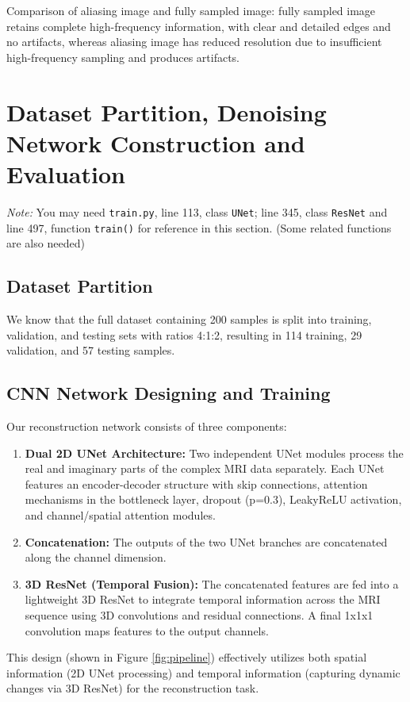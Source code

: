\documentclass{article}
\begin{document}
Comparison of aliasing image and fully sampled image: fully sampled image retains
complete high-frequency information, with clear and detailed edges and no artifacts,
whereas aliasing image has reduced resolution due to insufficient high-frequency
sampling and produces artifacts.



\section{Dataset Partition, Denoising Network Construction and Evaluation}
\textit{Note: }You may need \texttt{train.py}, line 113, class \texttt{UNet};
line 345, class \texttt{ResNet} and line 497, function \texttt{train()}
for reference in this section. (Some related functions are also needed)

\subsection{Dataset Partition}

We know that the full dataset containing 200 samples is split into training, validation,
and testing sets with ratios 4:1:2, resulting in 114 training, 29 validation,
and 57 testing samples.

\subsection{CNN Network Designing and Training}
Our reconstruction network consists of three components:
\begin{enumerate}
  \item \textbf{Dual 2D UNet Architecture:} Two independent UNet modules process the real and imaginary parts of the complex MRI data separately. Each UNet features an encoder-decoder structure with skip connections, attention mechanisms in the bottleneck layer, dropout (p=0.3), LeakyReLU activation, and channel/spatial attention modules.
  \item \textbf{Concatenation:} The outputs of the two UNet branches are concatenated along the channel dimension.
  \item \textbf{3D ResNet (Temporal Fusion):} The concatenated features are fed into a lightweight 3D ResNet to integrate temporal information across the MRI sequence using 3D convolutions and residual connections. A final 1x1x1 convolution maps features to the output channels.
\end{enumerate}
This design (shown in Figure \ref{fig:pipeline}) effectively utilizes both spatial information (2D UNet processing) and temporal information (capturing dynamic changes via 3D ResNet) for the reconstruction task.
\end{document}
